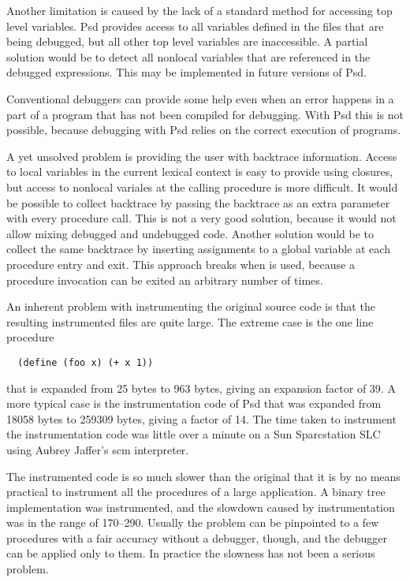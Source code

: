 Another limitation is caused by the lack of a standard method for
accessing top level variables. Psd provides access to all variables
defined in the files that are being debugged, but all other top level
variables are inaccessible. A partial solution would be to detect all
nonlocal variables that are referenced in the debugged expressions.
This may be implemented in future versions of Psd.

Conventional debuggers can provide some help even when an error
happens in a part of a program that has not been compiled for debugging.
With Psd this is not possible, because debugging with Psd relies on
the correct execution of programs.

A yet unsolved problem is providing the user with backtrace
information. Access to local variables in the current lexical context
is easy to provide using closures, but access to nonlocal variales at
the calling procedure is more difficult. It would be possible to
collect backtrace by passing the backtrace as an extra parameter with
every procedure call. This is not a very good solution, because it
would not allow mixing debugged and undebugged code. Another solution
would be to collect the same backtrace by inserting assignments to a
global variable at each procedure entry and exit. This approach breaks
when  is used, because a
procedure invocation can be exited an arbitrary number of times.

An inherent problem with instrumenting the original source code is
that the resulting instrumented files are quite large. The extreme
case is the one line procedure
\begin{verbatim}
  (define (foo x) (+ x 1))
\end{verbatim}
that is expanded from 25 bytes to 963 bytes, giving an expansion
factor of 39. A more typical case is the instrumentation code of Psd
that was expanded from 18058 bytes to 259309 bytes, giving a factor of
14. The time taken to instrument the instrumentation code was little
over a minute on a Sun Sparcstation SLC using Aubrey Jaffer's scm
interpreter.

The instrumented code is so much slower than the original that it is
by no means practical to instrument all the procedures of a large
application. A binary tree implementation was instrumented, and the
slowdown caused by instrumentation was in the range of 170--290.
Usually the problem can be pinpointed to a few procedures with a fair
accuracy without a debugger, though, and the debugger can be applied
only to them. In practice the slowness has not been a serious problem.

